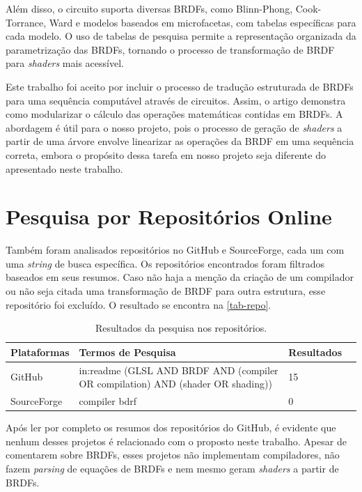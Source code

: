Além disso, o circuito suporta diversas BRDFs, como Blinn-Phong, Cook-Torrance, Ward e modelos baseados em microfacetas, com tabelas específicas para cada modelo. O uso de tabelas de pesquisa permite a representação organizada da parametrização das BRDFs, tornando o processo de transformação de BRDF para \textit{shaders} mais acessível.

Este trabalho foi aceito por incluir o processo de tradução estruturada de BRDFs para uma sequência computável através de circuitos. Assim, o artigo demonstra como modularizar o cálculo das operações matemáticas contidas em BRDFs. A abordagem é útil para o nosso projeto, pois o processo de geração de \textit{shaders} a partir de uma árvore envolve linearizar as operações da BRDF em uma sequência correta, embora o propósito dessa tarefa em nosso projeto seja diferente do apresentado neste trabalho.


\section{Pesquisa por Repositórios Online}
Também foram analisados repositórios no GitHub e SourceForge, cada um com uma \textit{string} de busca específica. Os repositórios encontrados foram filtrados baseados em seus resumos. Caso não haja a menção da criação de um compilador ou não seja citada uma transformação de BRDF para outra estrutura, esse repositório foi excluído. O resultado se encontra na \autoref{tab-repo}.






\begin{table}[H]
\ABNTEXfontereduzida
\caption[bases]{\small Resultados da pesquisa nos repositórios.}
\label{tab-repo}
\begin{tabular}{p{2.6cm}|p{6.0cm}|p{2.25cm}|p{3.40cm}}
   \textbf{Plataformas} & \textbf{Termos de Pesquisa}  & \textbf{Resultados}\\
   \hline
   GitHub
   &
   in:readme (GLSL AND BRDF AND  (compiler OR compilation) AND (shader OR shading))
   & 15
   \\ \hline
   SourceForge
   &
   compiler bdrf
   & 0
\end{tabular}
\end{table}




Após ler por completo os resumos dos repositórios do GitHub, é evidente que nenhum desses projetos é relacionado com o proposto neste trabalho. Apesar de comentarem sobre BRDFs, esses projetos não implementam compiladores, não fazem \textit{parsing} de equações de BRDFs e nem mesmo geram \textit{shaders} a partir de BRDFs.

